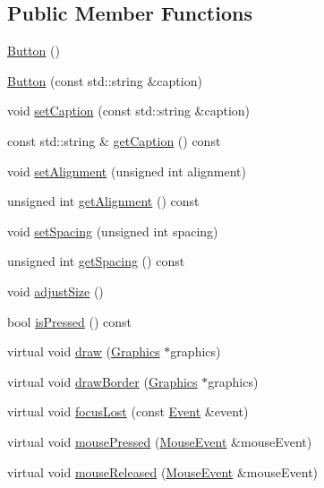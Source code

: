 \subsection*{Public Member Functions}
\begin{DoxyCompactItemize}
\item 
\hyperlink{classgcn_1_1Button_aaa7539ca928807770fcfa0ec8c028bb4}{Button} ()
\item 
\hyperlink{classgcn_1_1Button_aedec0a418abf43eca568a90e1e5b1e9c}{Button} (const std\+::string \&caption)
\item 
void \hyperlink{classgcn_1_1Button_a9f49ad1f0770a87a01fc77705f0b3a31}{set\+Caption} (const std\+::string \&caption)
\item 
const std\+::string \& \hyperlink{classgcn_1_1Button_a9d3be2d0f07d965feeabd0da7a6acf28}{get\+Caption} () const 
\item 
void \hyperlink{classgcn_1_1Button_a04bcbfda4c5fbd2781a78b126ea6f0ce}{set\+Alignment} (unsigned int alignment)
\item 
unsigned int \hyperlink{classgcn_1_1Button_aa8cbe52bc613600f60cb1cb292e3d56b}{get\+Alignment} () const 
\item 
void \hyperlink{classgcn_1_1Button_a2a04e95028ff614e90d9fbf0afb603e7}{set\+Spacing} (unsigned int spacing)
\item 
unsigned int \hyperlink{classgcn_1_1Button_a7a12a9dc96a30561c013099e648b612e}{get\+Spacing} () const 
\item 
void \hyperlink{classgcn_1_1Button_aea7387d84dd3ab70fb047c9c08a15ea2}{adjust\+Size} ()
\item 
bool \hyperlink{classgcn_1_1Button_a4a45119d1476b20834176ab8ffc95826}{is\+Pressed} () const 
\item 
virtual void \hyperlink{classgcn_1_1Button_a741dca35284e5155cd99c1e962e3d1e8}{draw} (\hyperlink{classgcn_1_1Graphics}{Graphics} $\ast$graphics)
\item 
virtual void \hyperlink{classgcn_1_1Button_a5d7f1dba36aa61524fb4c5b0ad47198b}{draw\+Border} (\hyperlink{classgcn_1_1Graphics}{Graphics} $\ast$graphics)
\item 
virtual void \hyperlink{classgcn_1_1Button_a6cee079024ffd4e8eeb8b682aade93c0}{focus\+Lost} (const \hyperlink{classgcn_1_1Event}{Event} \&event)
\item 
virtual void \hyperlink{classgcn_1_1Button_a7fe61128288965a4ec81d7e30cd3eba7}{mouse\+Pressed} (\hyperlink{classgcn_1_1MouseEvent}{Mouse\+Event} \&mouse\+Event)
\item 
virtual void \hyperlink{classgcn_1_1Button_abd8ca8cb9535bbce7e93006b792bf7dd}{mouse\+Released} (\hyperlink{classgcn_1_1MouseEvent}{Mouse\+Event} \&mouse\+Event)

\end{DoxyCompactItemize}
